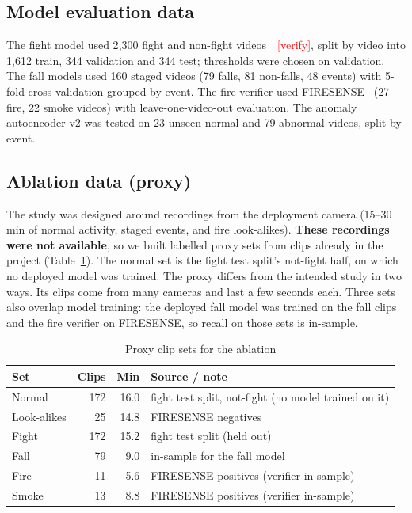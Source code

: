 \documentclass[conference]{IEEEtran}
\newcommand{\verify}{\textcolor{red}{[verify]}}
\begin{document}
\subsection{Model evaluation data}
The fight model used 2{,}300 fight and non-fight videos~\cite{akti2019}~\verify{}, split by video into 1{,}612 train, 344 validation and 344 test; thresholds were chosen on validation. The fall models used 160 staged videos (79 falls, 81 non-falls, 48 events) with 5-fold cross-validation grouped by event. The fire verifier used FIRESENSE~\cite{dimitropoulos2015} (27 fire, 22 smoke videos) with leave-one-video-out evaluation. The anomaly autoencoder v2 was tested on 23 unseen normal and 79 abnormal videos, split by event.

\subsection{Ablation data (proxy)}
The study was designed around recordings from the deployment camera (15--30\,min of normal activity, staged events, and fire look-alikes). \textbf{These recordings were not available}, so we built labelled proxy sets from clips already in the project (Table~\ref{tab:sets}). The normal set is the fight test split's not-fight half, on which no deployed model was trained. The proxy differs from the intended study in two ways. Its clips come from many cameras and last a few seconds each. Three sets also overlap model training: the deployed fall model was trained on the fall clips and the fire verifier on FIRESENSE, so recall on those sets is in-sample.

\begin{table}[t]
\caption{Proxy clip sets for the ablation}
\label{tab:sets}
\centering
\footnotesize
\begin{tabular}{lrrl}
\toprule
Set & Clips & Min & Source / note \\
\midrule
Normal & 172 & 16.0 & fight test split, not-fight (no model trained on it) \\
Look-alikes & 25 & 14.8 & FIRESENSE negatives \\
Fight & 172 & 15.2 & fight test split (held out) \\
Fall & 79 & 9.0 & in-sample for the fall model \\
Fire & 11 & 5.6 & FIRESENSE positives (verifier in-sample) \\
Smoke & 13 & 8.8 & FIRESENSE positives (verifier in-sample) \\
\bottomrule
\end{tabular}
\end{table}
\end{document}
